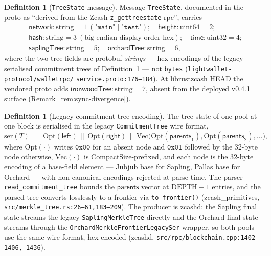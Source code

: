 \documentclass[11pt,a4paper]{article}
\theoremstyle{definition}
\newtheorem{definition}[theorem]{Definition}
\begin{document}
\begin{definition}[\texttt{TreeState} message]\label{def:sync-treestate}
Message \texttt{TreeState}, documented in the proto as ``derived from
the Zcash \texttt{z\_gettreestate} rpc'', carries
\[
\begin{aligned}
&\mathsf{network} : \text{string} = 1
  \ (\texttt{"main"} \mid \texttt{"test"}); \quad
 \mathsf{height} : \text{uint64} = 2; \\
&\mathsf{hash} : \text{string} = 3
  \ (\text{big-endian display-order hex}); \quad
 \mathsf{time} : \text{uint32} = 4; \\
&\mathsf{saplingTree} : \text{string} = 5; \quad
 \mathsf{orchardTree} : \text{string} = 6,
\end{aligned}
\]
where the two tree fields are protobuf \emph{strings} --- hex encodings
of the legacy-serialised commitment trees of
Definition~\ref{def:sync-legacy-ser} --- not \texttt{bytes}
(\texttt{lightwallet-protocol/walletrpc/}\allowbreak
\texttt{service.proto:176--184}). At
\textsf{librustzcash} HEAD the vendored proto adds
$\mathsf{ironwoodTree} : \text{string} = 7$, absent from the deployed
v0.4.1 surface (Remark~\ref{rem:sync-divergence}).
\end{definition}

\begin{definition}[Legacy commitment-tree encoding]\label{def:sync-legacy-ser}
The tree state of one pool at one block is serialised in the legacy
\texttt{CommitmentTree} wire format,
\[
\mathrm{ser}(T) \;=\; \mathrm{Opt}(\mathsf{left}) \,\|\,
\mathrm{Opt}(\mathsf{right}) \,\|\,
\mathrm{Vec}\bigl(\mathrm{Opt}(\mathsf{parents}_1), \mathrm{Opt}(
\mathsf{parents}_2), \ldots\bigr),
\]
where $\mathrm{Opt}(\cdot)$ writes $\mathtt{0x00}$ for an absent node and
$\mathtt{0x01}$ followed by the $32$-byte node otherwise,
$\mathrm{Vec}(\cdot)$ is CompactSize-prefixed, and each node is the
$32$-byte encoding of a base-field element --- Jubjub base for Sapling,
Pallas base for Orchard --- with non-canonical encodings rejected at
parse time. The parser \texttt{read\_commitment\_tree} bounds the
$\mathsf{parents}$ vector at $\mathrm{DEPTH} - 1$ entries, and the parsed
tree converts losslessly to a frontier via \texttt{to\_frontier()}
(\textsf{zcash\_primitives}, \texttt{src/merkle\_tree.rs:26--61,183--209}).
The producer is \textsf{zcashd}: the Sapling final state streams the
legacy \texttt{SaplingMerkleTree} directly and the Orchard final state
streams through the \texttt{OrchardMerkleFrontierLegacySer} wrapper, so
both pools use the same wire format, hex-encoded
(\textsf{zcashd},
\texttt{src/rpc/blockchain.cpp:1402--1406,--1436}).
\end{definition}
\end{document}
